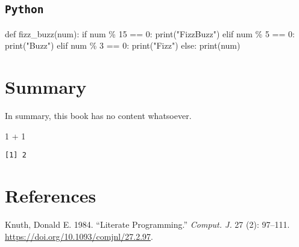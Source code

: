 \documentclass[
  letterpaper,
  DIV=11,
  numbers=noendperiod]{scrreprt}
\newenvironment{Shaded}{\begin{snugshade}}{\end{snugshade}}
\newcommand{\BuiltInTok}[1]{\textcolor[rgb]{0.00,0.23,0.31}{#1}}
\newcommand{\ControlFlowTok}[1]{\textcolor[rgb]{0.00,0.23,0.31}{#1}}
\newcommand{\DecValTok}[1]{\textcolor[rgb]{0.68,0.00,0.00}{#1}}
\newcommand{\KeywordTok}[1]{\textcolor[rgb]{0.00,0.23,0.31}{#1}}
\newcommand{\NormalTok}[1]{\textcolor[rgb]{0.00,0.23,0.31}{#1}}
\newcommand{\OperatorTok}[1]{\textcolor[rgb]{0.37,0.37,0.37}{#1}}
\newcommand{\SpecialCharTok}[1]{\textcolor[rgb]{0.37,0.37,0.37}{#1}}
\newcommand{\StringTok}[1]{\textcolor[rgb]{0.13,0.47,0.30}{#1}}
\newlength{\cslhangindent}
\newlength{\cslentryspacingunit} %
\newenvironment{CSLReferences}[2] %
 {%
  \setlength{\parindent}{0pt}
  \ifodd #1
  \let\oldpar\par
  \def\par{\hangindent=\cslhangindent\oldpar}
  \fi
  \setlength{\parskip}{#2\cslentryspacingunit}
 }%
 {}
\begin{document}
\section{\texorpdfstring{\texttt{Python}}{Python}}

\begin{Shaded}
\begin{Highlighting}[]
\KeywordTok{def}\NormalTok{ fizz\_buzz(num):}
  \ControlFlowTok{if}\NormalTok{ num }\OperatorTok{\%} \DecValTok{15} \OperatorTok{==} \DecValTok{0}\NormalTok{:}
    \BuiltInTok{print}\NormalTok{(}\StringTok{"FizzBuzz"}\NormalTok{)}
  \ControlFlowTok{elif}\NormalTok{ num }\OperatorTok{\%} \DecValTok{5} \OperatorTok{==} \DecValTok{0}\NormalTok{:}
    \BuiltInTok{print}\NormalTok{(}\StringTok{"Buzz"}\NormalTok{)}
  \ControlFlowTok{elif}\NormalTok{ num }\OperatorTok{\%} \DecValTok{3} \OperatorTok{==} \DecValTok{0}\NormalTok{:}
    \BuiltInTok{print}\NormalTok{(}\StringTok{"Fizz"}\NormalTok{)}
  \ControlFlowTok{else}\NormalTok{:}
    \BuiltInTok{print}\NormalTok{(num)}
\end{Highlighting}
\end{Shaded}


\hypertarget{summary}{%
\chapter{Summary}\label{summary}}

In summary, this book has no content whatsoever.

\begin{Shaded}
\begin{Highlighting}[]
\DecValTok{1} \SpecialCharTok{+} \DecValTok{1}
\end{Highlighting}
\end{Shaded}

\begin{verbatim}
[1] 2
\end{verbatim}


\hypertarget{references}{%
\chapter*{References}\label{references}}


\hypertarget{refs}{}
\begin{CSLReferences}{1}{0}
\leavevmode{}%
Knuth, Donald E. 1984. {``Literate Programming.''} \emph{Comput. J.} 27
(2): 97--111. \url{https://doi.org/10.1093/comjnl/27.2.97}.

\end{CSLReferences}
\end{document}
